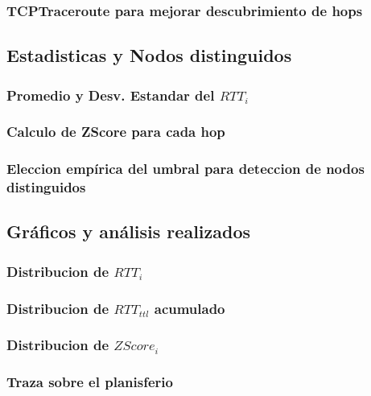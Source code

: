 \subsubsection{TCPTraceroute para mejorar descubrimiento de hops}

\subsection{Estadisticas y Nodos distinguidos}
\subsubsection{Promedio y Desv. Estandar del $RTT_i$}
\subsubsection{Calculo de ZScore para cada hop}
\subsubsection{Eleccion emp\'irica del umbral para deteccion de nodos distinguidos}

\subsection{Gr\'aficos y an\'alisis realizados}
\subsubsection{Distribucion de $RTT_i$}
\subsubsection{Distribucion de $RTT_{ttl}$ acumulado}
\subsubsection{Distribucion de $ZScore_i$}
\subsubsection{Traza sobre el planisferio}

